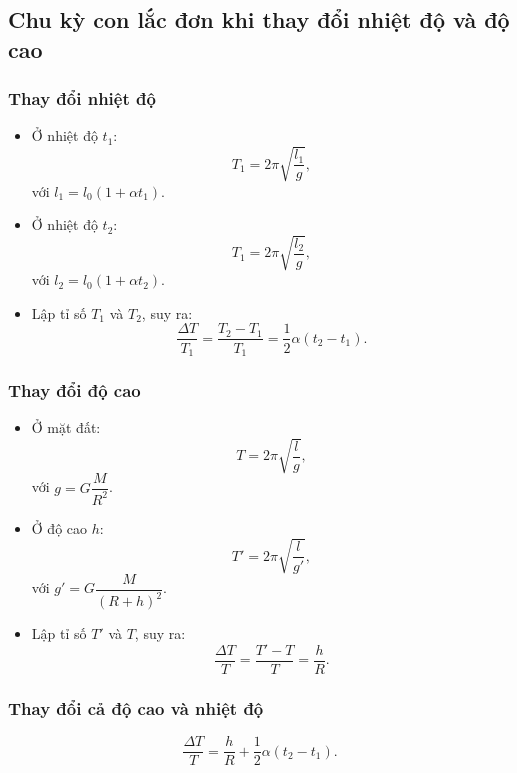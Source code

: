 \subsection{Chu kỳ con lắc đơn khi thay đổi nhiệt độ và độ cao}
\subsubsection{Thay đổi nhiệt độ}
\begin{itemize}
	\item Ở nhiệt độ $t_1$: 
	\begin{equation*}
		T_1=2\pi\sqrt{\dfrac{l_1}{g}},
	\end{equation*}
	với $l_1=l_0 (1+\alpha t_1)$.
	\item Ở nhiệt độ $t_2$: 
	\begin{equation*}
		T_1=2\pi\sqrt{\dfrac{l_2}{g}},
	\end{equation*}
	với $l_2=l_0 (1+\alpha t_2)$.
	\item Lập tỉ số $T_1$ và $T_2$, suy ra:
	\begin{equation*}
		\dfrac{\Delta T}{T_1} = \dfrac{T_2-T_1}{T_1} =\dfrac{1}{2} \alpha (t_2 -t_1).
	\end{equation*}
\end{itemize}
\subsubsection{Thay đổi độ cao}
\begin{itemize}
	\item Ở mặt đất:
	\begin{equation*}
		T=2\pi \sqrt{\dfrac{l}{g}},
	\end{equation*}
	với $g = G \dfrac{M}{R^2}$.
	\item Ở độ cao $h$:
	\begin{equation*}
		T'=2\pi \sqrt{\dfrac{l}{g'}}, 
	\end{equation*}
	với $g'= G \dfrac{M}{(R+h)^2}$.
	\item Lập tỉ số $T'$ và $T$, suy ra: 
	\begin{equation*}
		\dfrac{\Delta T}{T} = \dfrac{T'-T}{T} =\dfrac{h}{R}.
	\end{equation*}
\end{itemize}
\subsubsection{Thay đổi cả độ cao và nhiệt độ}

\begin{equation*}
	\dfrac{\Delta T}{T}=\dfrac{h}{R} +\dfrac{1}{2} \alpha (t_2-t_1).
\end{equation*}
